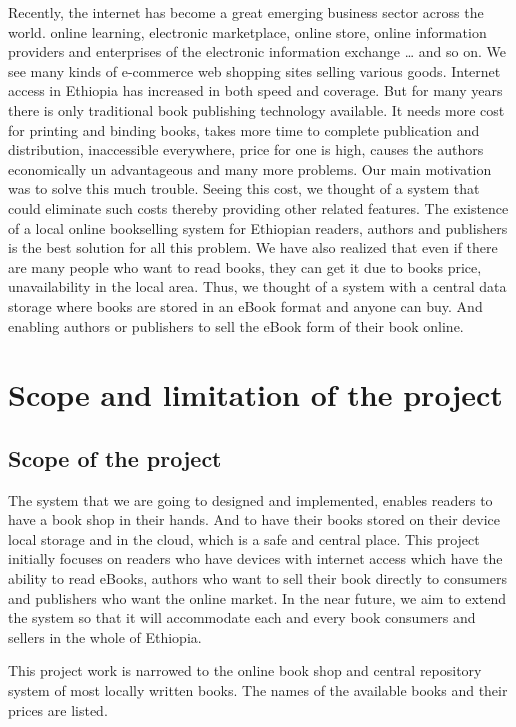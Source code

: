 Recently, the internet has become a great emerging business sector across the world. online learning, electronic marketplace, online store, online information providers and enterprises of the electronic information exchange … and so on. We see many kinds of e-commerce web shopping sites selling various goods. Internet access in Ethiopia has increased in both speed and coverage. But for many years there is only traditional book publishing technology available. It needs more cost for printing and binding books, takes more time to complete publication and distribution, inaccessible everywhere, price for one is high, causes the authors economically un advantageous and many more problems. Our main motivation was to solve this much trouble. Seeing this cost, we thought of a system that could eliminate such costs thereby providing other related features. The existence of a local online bookselling system for Ethiopian readers, authors and publishers is the best solution for all this problem. We have also realized that even if there are many people who want to read books, they can get it due to books price, unavailability in the local area. Thus, we thought of a system with a central data storage where books are stored in an eBook format and anyone can buy. And enabling authors or publishers to sell the eBook form of their book online.

	\section{Scope and limitation of the project}
		\subsection{Scope of the project}

The system that we are going to designed and implemented, enables readers to have a book shop in their hands. And to have their books stored on their device local storage and in the cloud, which is a safe and central place. This project initially focuses on readers who have devices with internet access which have the ability to read eBooks, authors who want to sell their book directly to consumers and publishers who want the online market. In the near future, we aim to extend the system so that it will accommodate each and every book consumers and sellers in the whole of Ethiopia.

This project work is narrowed to the online book shop and central repository system of most locally written books. The names of the available books and their prices are listed.

